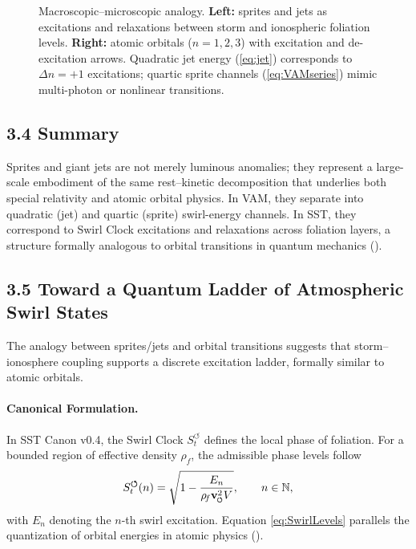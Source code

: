 \documentclass[reprint,aps,onecolumn,nofootinbib]{revtex4-2}
\newcommand{\swirlarrow}{%
    \mathchoice{\mkern-2mu\scriptstyle\boldsymbol{\circlearrowleft}}%
    {\mkern-2mu\scriptstyle\boldsymbol{\circlearrowleft}}%
    {\mkern-2mu\scriptscriptstyle\boldsymbol{\circlearrowleft}}%
    {\mkern-2mu\scriptscriptstyle\boldsymbol{\circlearrowleft}}%
}
\newcommand{\vswirl}{\mathbf{v}_{\swirlarrow}}
\newcommand{\rhof}{\rho_{\!f}}                           %
\newcommand{\Ce}{\vswirl}
\begin{document}
\begin{figure}[t]
    \caption{Macroscopic--microscopic analogy.
    \textbf{Left:} sprites and jets as excitations and relaxations between storm and ionospheric foliation levels.
    \textbf{Right:} atomic orbitals ($n=1,2,3$) with excitation and de-excitation arrows.
    Quadratic jet energy (\eqref{eq:jet}) corresponds to $\Delta n=+1$ excitations;
    quartic sprite channels (\eqref{eq:VAMseries}) mimic multi-photon or nonlinear transitions.}
    \label{fig:TLEvsOrbitals}
    \end{figure}

\subsection*{3.4 Summary}

    Sprites and giant jets are not merely luminous anomalies; they
    represent a large-scale embodiment of the same rest--kinetic
    decomposition that underlies both special relativity and
    atomic orbital physics.
    In VAM, they separate into quadratic (jet) and quartic (sprite)
    swirl-energy channels.
    In SST, they correspond to Swirl Clock excitations and relaxations
    across foliation layers, a structure formally analogous to orbital
    transitions in quantum mechanics
    (\cite{Bohr1913Hydrogen,Dirac1928Electron,BetheSalpeter1957}).

\subsection*{3.5 Toward a Quantum Ladder of Atmospheric Swirl States}

    The analogy between sprites/jets and orbital transitions suggests that
    storm--ionosphere coupling supports a discrete excitation ladder,
    formally similar to atomic orbitals.

    \paragraph{Canonical Formulation.}
        In SST Canon v0.4, the Swirl Clock $S_t^{\boldsymbol{\circlearrowleft}}$
        defines the local phase of foliation. For a bounded region of effective
        density $\rhof$, the admissible phase levels follow
        \begin{equation}
        S_t^{\boldsymbol{\circlearrowleft}}(n)
        = \sqrt{1 - \frac{E_n}{\rhof \Ce^2 V}},
        \qquad n \in \mathbb{N},
        \label{eq:SwirlLevels}
        \end{equation}
        with $E_n$ denoting the $n$-th swirl excitation.
        Equation \eqref{eq:SwirlLevels} parallels the quantization
        of orbital energies in atomic physics
        (\cite{Bohr1913Hydrogen,Dirac1928Electron,BetheSalpeter1957}).
\end{document}
